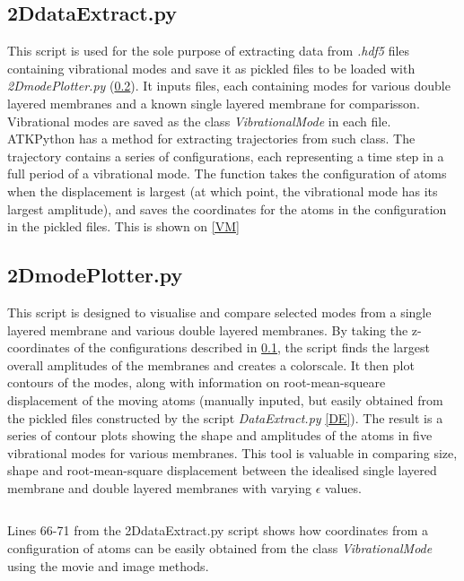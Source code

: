 \subsection{2DdataExtract.py}\label{2DE}
This script is used for the sole purpose of extracting data from \textit{.hdf5} files containing vibrational modes and save it as pickled files to be loaded with \textit{2DmodePlotter.py} (\cref{2DMP}). It inputs files, each containing modes for various double layered membranes and a known single layered membrane for comparisson. Vibrational modes are saved as the class \textit{VibrationalMode} in each file. ATKPython has a method for extracting trajectories from such class. The trajectory contains a series of configurations, each representing a time step in a full period of a vibrational mode. The function takes the configuration of atoms when the displacement is largest (at which point, the vibrational mode has its largest amplitude), and saves the coordinates for the atoms in the configuration in the pickled files. This is shown on \cref{VM}
\subsection{2DmodePlotter.py}\label{2DMP}
This script is designed to visualise and compare selected modes from a single layered membrane and various double layered membranes. By taking the z-coordinates of the configurations described in \cref{2DE}, the script finds the largest overall amplitudes of the membranes and creates a colorscale. It then plot contours of the modes, along with information on root-mean-squeare displacement of the moving atoms (manually inputed, but easily obtained from the pickled files constructed by the script \textit{DataExtract.py} \cref{DE}). The result is a series of contour plots showing the shape and amplitudes of the atoms in five vibrational modes for various membranes. This tool is valuable in comparing size, shape and root-mean-square displacement between the idealised single layered membrane and double layered membranes with varying $\epsilon$ values.
\onecolumngrid

\begin{listing}[H]
 \inputminted[python3=true,bgcolor=Black,linenos=true,firstline=66,lastline=71]{python}{VNL/PythonScripts/Scripts/2DdataExtract.py}
 \caption{Lines 66-71 from the 2DdataExtract.py script shows how coordinates from a configuration of atoms can be easily obtained from the class \textit{VibrationalMode} using the movie and image methods.}
 \label{VM}
\end{listing}
\twocolumngrid